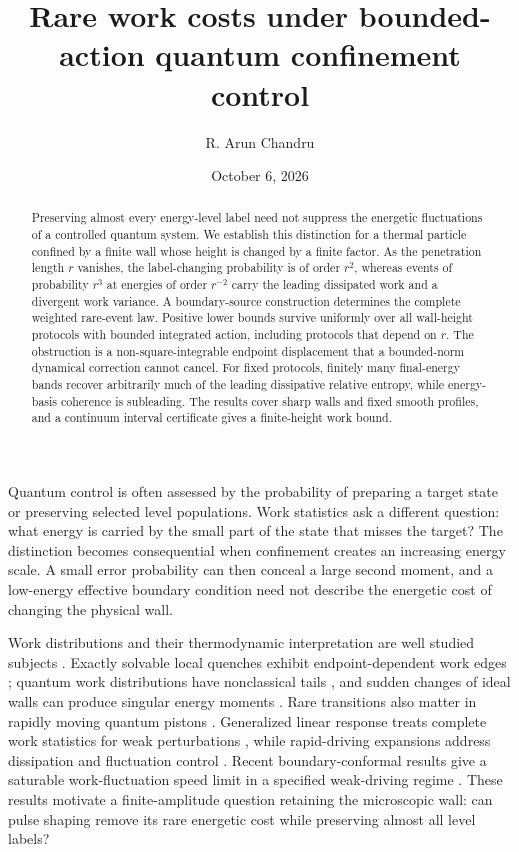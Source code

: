 \documentclass[aps,prl,reprint,superscriptaddress,longbibliography]{revtex4-2}
\begin{document}
\title{Rare work costs under bounded-action quantum confinement control}
\author{R. Arun Chandru}
\date{October 6, 2026}
\begin{abstract}
Preserving almost every energy-level label need not suppress the energetic fluctuations of a controlled quantum system. We establish this distinction for a thermal particle confined by a finite wall whose height is changed by a finite factor. As the penetration length $r$ vanishes, the label-changing probability is of order $r^2$, whereas events of probability $r^3$ at energies of order $r^{-2}$ carry the leading dissipated work and a divergent work variance. A boundary-source construction determines the complete weighted rare-event law. Positive lower bounds survive uniformly over all wall-height protocols with bounded integrated action, including protocols that depend on $r$. The obstruction is a non-square-integrable endpoint displacement that a bounded-norm dynamical correction cannot cancel. For fixed protocols, finitely many final-energy bands recover arbitrarily much of the leading dissipative relative entropy, while energy-basis coherence is subleading. The results cover sharp walls and fixed smooth profiles, and a continuum interval certificate gives a finite-height work bound.
\end{abstract}
\maketitle

Quantum control is often assessed by the probability of preparing a target state or preserving selected level populations. Work statistics ask a different question: what energy is carried by the small part of the state that misses the target? The distinction becomes consequential when confinement creates an increasing energy scale. A small error probability can then conceal a large second moment, and a low-energy effective boundary condition need not describe the energetic cost of changing the physical wall.

Work distributions and their thermodynamic interpretation are well studied subjects \cite{Talkner,Campisi}. Exactly solvable local quenches exhibit endpoint-dependent work edges \cite{Smacchia}; quantum work distributions have nonclassical tails \cite{Jarzynski}, and sudden changes of ideal walls can produce singular energy moments \cite{Aslangul}. Rare transitions also matter in rapidly moving quantum pistons \cite{Quan}. Generalized linear response treats complete work statistics for weak perturbations \cite{Guarnieri}, while rapid-driving expansions address dissipation and fluctuation control \cite{Rolandi}. Recent boundary-conformal results give a saturable work-fluctuation speed limit in a specified weak-driving regime \cite{Xia}. These results motivate a finite-amplitude question retaining the microscopic wall: can pulse shaping remove its rare energetic cost while preserving almost all level labels?
\end{document}
